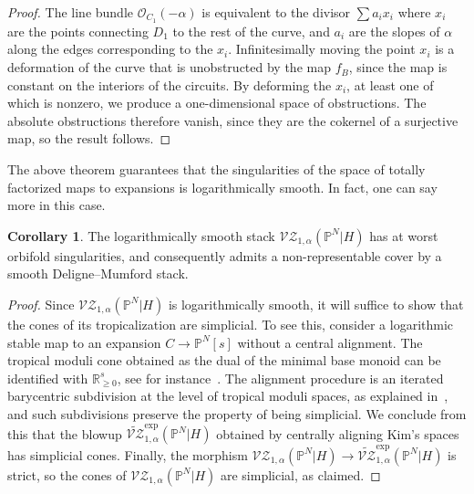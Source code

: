 \documentclass[11pt]{amsart}
\renewcommand{\to}{\rightarrow}
\theoremstyle{definition}
\newtheorem{cor}[thm]{Corollary}
\theoremstyle{definition}
\begin{document}
\begin{proof}
The line bundle $\mathcal O_{C_1}(-\alpha)$ is equivalent to the divisor $\sum a_i x_i$ where $x_i$ are the points connecting $D_1$ to the rest of the curve, and $a_i$ are the slopes of $\alpha$ along the edges corresponding to the $x_i$. Infinitesimally moving the point $x_i$ is a deformation of the curve that is unobstructed by the map $f_B$, since the map is constant on the interiors of the circuits. By deforming the $x_i$, at least one of which is nonzero, we produce a one-dimensional space of obstructions. The absolute obstructions therefore vanish, since they are the cokernel of a surjective map, so the result follows.  
\end{proof}

The above theorem guarantees that the singularities of the space of totally factorized maps to expansions is logarithmically smooth. In fact, one can say more in this case.

\begin{cor}
The logarithmically smooth stack $\mathcal{VZ}_{1,\alpha}(\mathbb P^N|H)$ has at worst orbifold singularities, and consequently admits a non-representable cover by a smooth Deligne--Mumford stack.
\end{cor}

\begin{proof}
Since $\mathcal{VZ}_{1,\alpha}(\mathbb P^N|H)$ is logarithmically smooth, it will suffice to show that the cones of its tropicalization are simplicial. To see this, consider a logarithmic stable map to an expansion $C\to \mathbb P^N[s]$ without a central alignment. The tropical moduli cone obtained as the dual of the minimal base monoid can be identified with $\mathbb R_{\geq 0}^{s}$, see for instance~\cite[Section~2.2]{ChenDegeneration}. The alignment procedure is an iterated barycentric subdivision at the level of tropical moduli spaces, as explained in~\cite[Section 4.6]{RSPW}, and such subdivisions preserve the property of being simplicial. We conclude from this that the blowup $\widetilde{\mathcal{VZ}}^{\mathrm{exp}}_{1,\alpha}(\mathbb P^N|H)$ obtained by centrally aligning Kim's spaces has simplicial cones. Finally, the morphism $\mathcal{VZ}_{1,\alpha}(\mathbb P^N|H)\to \widetilde{\mathcal{VZ}}^{\mathrm{exp}}_{1,\alpha}(\mathbb P^N|H)$ is strict, so the cones of $\mathcal{VZ}_{1,\alpha}(\mathbb P^N|H)$ are simplicial, as claimed.
\end{proof}
\end{document}
